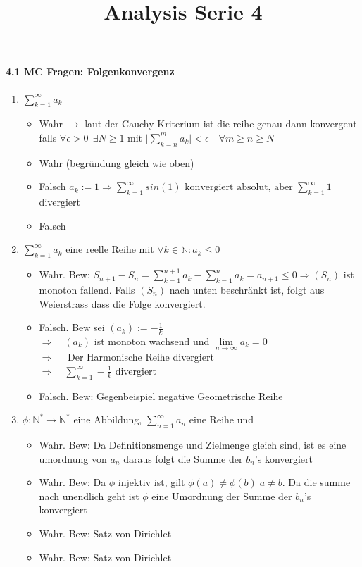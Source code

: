 \documentclass{report}
\title{Analysis Serie 4}
\begin{document}
\paragraph{4.1 MC Fragen: Folgenkonvergenz}
\begin{enumerate}[label = \alph*)]
\item $\displaystyle\sum_{k=1}^{\infty} a_k$
\begin{itemize}
\item Wahr  $\rightarrow$ laut der Cauchy Kriterium ist die reihe genau dann konvergent falls $\forall \epsilon > 0 \ \ \exists N \geq 1 \text{ mit } \bigg|\displaystyle\sum_{k=n}^{m} a_k \bigg| < \epsilon \quad \forall m \geq n \geq N$
\item Wahr (begründung gleich wie oben)
\item Falsch $a_k := 1 \Rightarrow \displaystyle\sum_{k=1}^{\infty} sin(1) \text{ konvergiert absolut, aber } \displaystyle\sum_{k=1}^{\infty} 1$  divergiert
\item Falsch
\end{itemize}
\item $\displaystyle\sum_{k=1}^{\infty} a_k$ eine reelle Reihe mit $\forall k \in \mathbb{N} : a_k \leq 0$
\begin{itemize}
\item Wahr. Bew: $S_{n+1} - S_{n} = \displaystyle\sum_{k=1}^{n+1}a_k - \displaystyle\sum_{k=1}^{n}a_k = a_{n+1} \leq 0 \Rightarrow (S_{n})$ ist monoton fallend. Falls $(S_{n})$ nach unten beschränkt ist, folgt aus Weierstrass dass die Folge konvergiert.
\item Falsch. Bew sei $(a_k) := -\frac{1}{k}$\\
$\Rightarrow \quad (a_k)$ ist monoton wachsend und $\lim\limits_{n \to \infty} a_k = 0$\\
$\Rightarrow \quad$ Der Harmonische Reihe divergiert\\
$\Rightarrow \quad  \displaystyle\sum_{k=1}^{\infty}-\frac{1}{k}$ divergiert
\item Falsch. Bew: Gegenbeispiel negative Geometrische Reihe
\end{itemize}
\item $\phi: \mathbb{N^*} \rightarrow \mathbb{N^*}$ eine Abbildung, $\displaystyle\sum_{n=1}^{\infty}a_n$ eine Reihe und 
\begin{itemize}
\item Wahr. Bew: Da Definitionsmenge und Zielmenge gleich sind, ist es eine umordnung von $a_n$ daraus folgt die Summe der $b_n$'s konvergiert 
\item Wahr. Bew: Da $\phi$ injektiv ist, gilt $\phi(a) \neq \phi(b) | a\neq b$. Da die summe nach unendlich geht ist $\phi$ eine Umordnung der Summe der $b_n$'s konvergiert
\item Wahr. Bew: Satz von Dirichlet
\item Wahr. Bew: Satz von Dirichlet
\end{itemize}
\end{enumerate}
\end{document}

